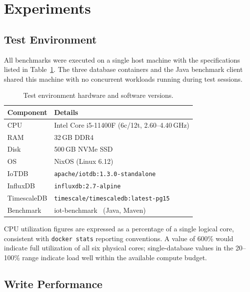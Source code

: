 \section{Experiments}
\label{sec:experiments}

\subsection{Test Environment}

All benchmarks were executed on a single host machine with the specifications listed in
Table~\ref{tab:hardware}. The three database containers and the Java benchmark client
shared this machine with no concurrent workloads running during test sessions.

\begin{table}[ht]
  \centering
  \caption{Test environment hardware and software versions.}
  \label{tab:hardware}
  \begin{tabular}{ll}
    \hline
    \textbf{Component} & \textbf{Details} \\
    \hline
    CPU       & Intel Core i5-11400F (6c/12t, 2.60--4.40\,GHz) \\
    RAM       & 32\,GB DDR4 \\
    Disk      & 500\,GB NVMe SSD \\
    OS        & NixOS (Linux 6.12) \\
    \hline
    IoTDB       & \texttt{apache/iotdb:1.3.0-standalone} \\
    InfluxDB    & \texttt{influxdb:2.7-alpine} \\
    TimescaleDB & \texttt{timescale/timescaledb:latest-pg15} \\
    Benchmark   & iot-benchmark~\cite{iotbenchmark} (Java, Maven) \\
    \hline
  \end{tabular}
\end{table}

CPU utilization figures are expressed as a percentage of a single logical core, consistent
with \texttt{docker stats} reporting conventions. A value of 600\% would indicate full
utilization of all six physical cores; single-database values in the 20--100\% range
indicate load well within the available compute budget.

\subsection{Write Performance}
\label{sec:write-results}

